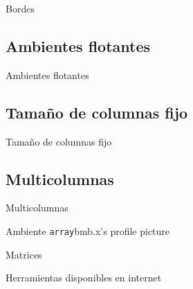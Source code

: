 \documentclass[../slides.tex]{subfiles}
\begin{document}
    \begin{frame}{Bordes}

    \end{frame}
    
    \subsection{Ambientes flotantes}
    \begin{frame}{Ambientes flotantes}
        
    \end{frame}

    \subsection{Tamaño de columnas fijo}
    
    \begin{frame}{Tamaño de columnas fijo}

    \end{frame}
        
    \subsection{Multicolumnas}

    \begin{frame}{Multicolumnas}

    \end{frame}

    \begin{frame}{Ambiente \texttt{array}bmb.x's profile picture}

    \end{frame}

    \begin{frame}{Matrices}

    \end{frame}

    \begin{frame}{Herramientas disponibles en internet}

    \end{frame}
\end{document}
